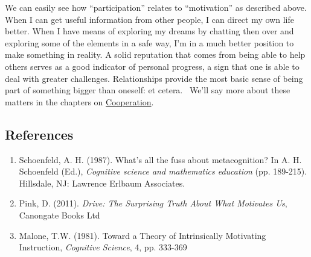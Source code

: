 We can easily see how ``participation'' relates to ``motivation'' as
described above. When I can get useful information from other people, I
can direct my own life better. When I have means of exploring my dreams
by chatting then over and exploring some of the elements in a safe way,
I'm in a much better position to make something in reality. A solid
reputation that comes from being able to help others serves as a good
indicator of personal progress, a sign that one is able to deal with
greater challenges. Relationships provide the most basic sense of being
part of something bigger than oneself: et cetera.~ We'll say more about
these matters in the chapters on
\href{http://peeragogy.org/cowork/}{Cooperation}.

\subsection{References}

\begin{enumerate}
\itemsep1pt\parskip0pt
\item
  Schoenfeld, A. H. (1987). What's all the fuss about metacognition? In
  A. H. Schoenfeld (Ed.), \emph{Cognitive science and mathematics
  education} (pp. 189-215). Hillsdale, NJ: Lawrence Erlbaum Associates.
\item
  Pink, D. (2011). \emph{Drive: The Surprising Truth About What
  Motivates Us}, Canongate Books Ltd
\item
  Malone, T.W. (1981). Toward a Theory of Intrinsically Motivating
  Instruction, \emph{Cognitive Science}, 4, pp. 333-369
\end{enumerate}
